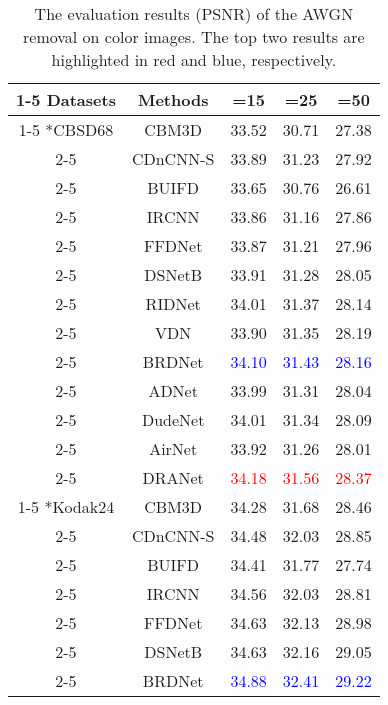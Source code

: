 \documentclass[3p,times]{elsarticle}
\begin{document}
\begin{table*}[htbp]
\centering
\caption{The evaluation results (PSNR) of the AWGN removal on color images. The top two results are highlighted in red and blue, respectively.}
\label{tab:color_PSNR}
\begin{tabular}{ccccc}
\cline{1-5}
Datasets &  Methods & =15 & =25 & =50 \\
\cline{1-5}
\multirow{13}*{CBSD68} & CBM3D \cite{Dabov2007} & 33.52 & 30.71 & 27.38\\
\cline{2-5}
    & CDnCNN-S \cite{Zhang2017} & 33.89 & 31.23 & 27.92 \\
\cline{2-5}
    & BUIFD \cite{Helou2020} & 33.65 & 30.76 & 26.61 \\
\cline{2-5}
    & IRCNN \cite{ZhangZGZ2017} & 33.86 & 31.16 & 27.86\\
\cline{2-5}
    & FFDNet \cite{Zhang2018} & 33.87 & 31.21 & 27.96\\
\cline{2-5}
    & DSNetB \cite{Peng2019} & 33.91 & 31.28 & 28.05\\
\cline{2-5}
    & RIDNet \cite{Anwar2019} & 34.01 & 31.37 & 28.14\\
\cline{2-5}
    & VDN \cite{Yue2019} & 33.90 & 31.35 & 28.19\\
\cline{2-5}
    & BRDNet \cite{Tian2020} & \textcolor{blue}{34.10} & \textcolor{blue}{31.43} & \textcolor{blue}{28.16} \\
\cline{2-5}
    & ADNet \cite{TianX2020} & 33.99 & 31.31 & 28.04\\
\cline{2-5}
    & DudeNet \cite{Tian2021} & 34.01 & 31.34 & 28.09\\
\cline{2-5}
    & AirNet \cite{Li2022} & 33.92 & 31.26 & 28.01\\
\cline{2-5}
    & DRANet & \textcolor{red}{34.18} & \textcolor{red}{31.56} & \textcolor{red}{28.37}\\
\cline{1-5}
\multirow{12}*{Kodak24} & CBM3D \cite{Dabov2007} & 34.28 & 31.68 & 28.46\\
\cline{2-5}
    & CDnCNN-S \cite{Zhang2017} & 34.48 & 32.03 & 28.85 \\
\cline{2-5}
    & BUIFD \cite{Helou2020} & 34.41 & 31.77 & 27.74\\
\cline{2-5}
    & IRCNN \cite{ZhangZGZ2017} & 34.56 & 32.03 & 28.81\\
\cline{2-5}
    & FFDNet \cite{Zhang2018} & 34.63 & 32.13 & 28.98 \\
\cline{2-5}
    & DSNetB \cite{Peng2019} & 34.63 & 32.16 & 29.05 \\
\cline{2-5}
    & BRDNet \cite{Tian2020} & \textcolor{blue}{34.88} & \textcolor{blue}{32.41} & \textcolor{blue}{29.22} \\

\end{tabular}
\end{table*}
\end{document}
